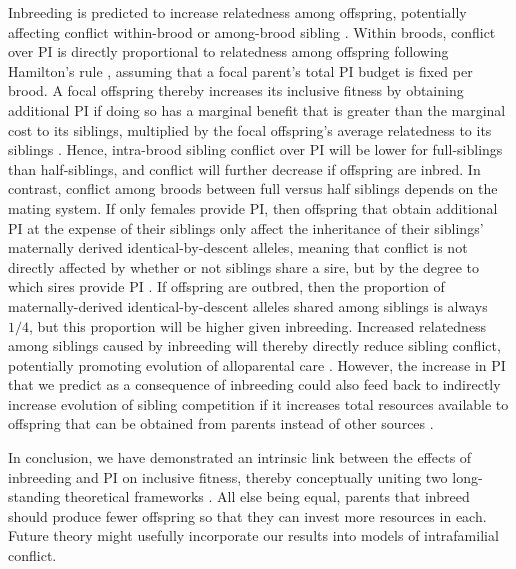 \documentclass[12pt]{article}
\begin{document}
{\color{blue}Inbreeding is predicted to increase relatedness among offspring, potentially affecting conflict within-brood or among-brood sibling \cite{Parker2002, Bonisoli-Alquati2011, Ruch2014}. Within broods, conflict over PI is directly proportional to relatedness among offspring following Hamilton's rule \cite{Hamilton1964, Hamilton1964a}, assuming that a focal parent's total PI budget is fixed per brood. A focal offspring thereby increases its inclusive fitness by obtaining additional PI if doing so has a marginal benefit that is greater than the marginal cost to its siblings, multiplied by the focal offspring's average relatedness to its siblings \cite{Parker2002}. Hence, intra-brood sibling conflict over PI will be lower for full-siblings than half-siblings, and conflict will further decrease if offspring are inbred. In contrast, conflict among broods between full versus half siblings depends on the mating system. If only females provide PI, then offspring that obtain additional PI at the expense of their siblings only affect the inheritance of their siblings' maternally derived identical-by-descent alleles, meaning that conflict is not directly affected by whether or not siblings share a sire, but by the degree to which sires provide PI \cite{Lessells1999, Parker2002}. If offspring are outbred, then the proportion of maternally-derived identical-by-descent alleles shared among siblings is always $1/4$, but this proportion will be higher given inbreeding. Increased relatedness among siblings caused by inbreeding will thereby directly reduce sibling conflict, potentially promoting evolution of alloparental care \cite{Gardner2014c, Davies2016}. However, the increase in PI that we predict as a consequence of inbreeding could also feed back to indirectly increase evolution of sibling competition if it increases total resources available to offspring that can be obtained from parents instead of other sources \cite{Gardner2011a}.}

{\color{blue}In conclusion, we have demonstrated an intrinsic link between the effects of inbreeding and PI on inclusive fitness, thereby conceptually uniting two long-standing theoretical frameworks \cite[][]{Parker1979, Parker2006, Macnair1978, Parker1978}. All else being equal, parents that inbreed should produce fewer offspring so that they can invest more resources in each. Future theory might usefully incorporate our results into models of intrafamilial conflict.}

\end{document}
